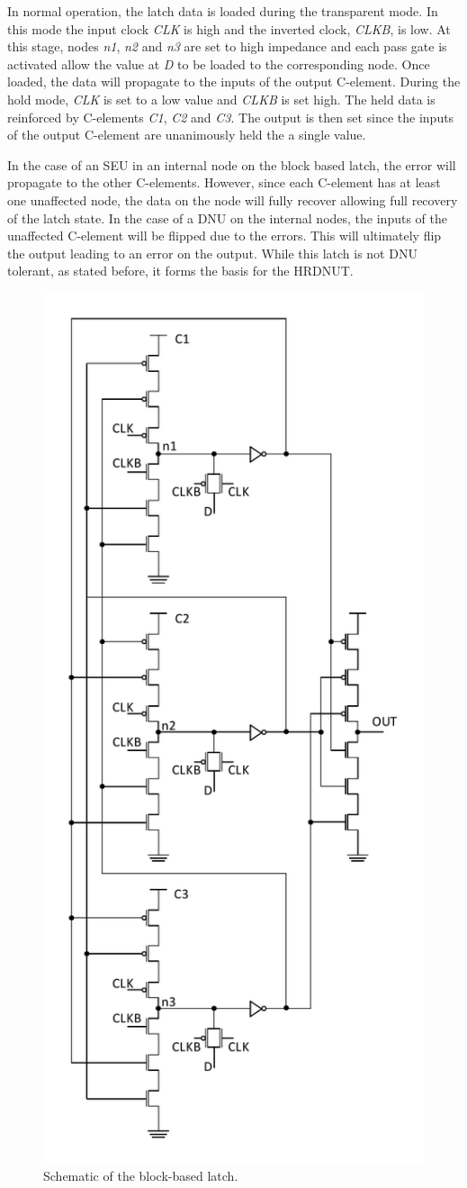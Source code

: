 In normal operation, the latch data is loaded during the transparent mode. In this mode the input clock \textit{CLK} is high and the inverted clock, \textit{CLKB}, is low. At this stage, nodes \textit{n1}, \textit{n2} and \textit{n3} are set to high impedance and each pass gate is activated allow the value at \textit{D} to be loaded to the corresponding node. Once loaded, the data will propagate to the inputs of the output C-element. During the hold mode, \textit{CLK} is set to a low value and \textit{CLKB} is set high. The held data is reinforced by C-elements \textit{C1}, \textit{C2} and \textit{C3}. The output is then set since the inputs of the output C-element are unanimously held the a single value.

In the case of an SEU in an internal node on the block based latch, the error will propagate to the other C-elements. However, since each C-element has at least one unaffected node, the data on the node will fully recover allowing full recovery of the latch state. In the case of a DNU on the internal nodes, the inputs of the unaffected C-element will be flipped due to the errors. This will ultimately flip the output leading to an error on the output. While this latch is not DNU tolerant, as stated before, it forms the basis for the HRDNUT.

\begin{figure}[!htbp]
	\centering
	\includegraphics[width=0.55\linewidth]{Figures/BLatch}
	\caption{Schematic of the block-based latch.}
	\label{BLatch}
\end{figure} 

